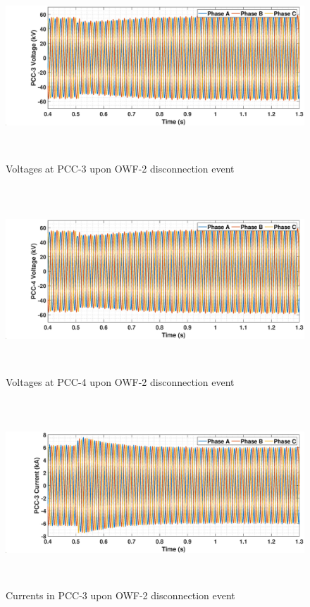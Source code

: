 \begin{figure}[H]
    \includegraphics[height = 7cm,width = \textwidth]{Diagrams/Appendix_C/VABC_WT3_WT2off.eps}
    \caption{Voltages at PCC-3 upon OWF-2 disconnection event}
    \label{VABC_WT3_WT2off}
\end{figure}

\begin{figure}[H]
    \includegraphics[height = 7cm,width = \textwidth]{Diagrams/Appendix_C/VABC_WT4_WT2off.eps}
    \caption{Voltages at PCC-4 upon OWF-2 disconnection event}
    \label{VABC_WT4_WT2off}
\end{figure}

\begin{figure}[H]
    \includegraphics[height = 7cm,width = \textwidth]{Diagrams/Appendix_C/IABC_WT3_WT2off.eps}
    \caption{Currents in PCC-3 upon OWF-2 disconnection event}
    \label{IABC_WT3_WT2off}
\end{figure}

